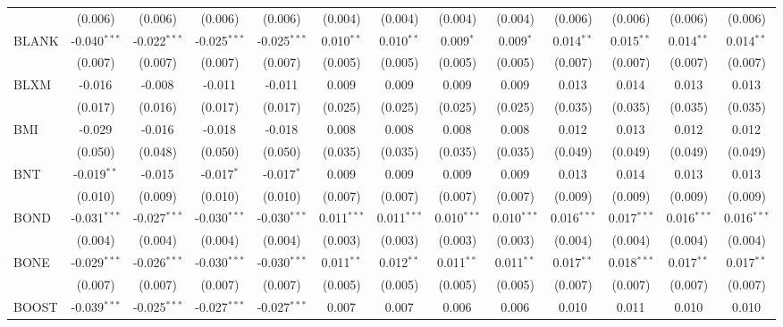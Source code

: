 \begin{table}[!htbp]
\begin{tabular}{@{\extracolsep{5pt}}lcccccccccccc}
  & (0.006) & (0.006) & (0.006) & (0.006) & (0.004) & (0.004) & (0.004) & (0.004) & (0.006) & (0.006) & (0.006) & (0.006) \\
 BLANK & -0.040$^{***}$ & -0.022$^{***}$ & -0.025$^{***}$ & -0.025$^{***}$ & 0.010$^{**}$ & 0.010$^{**}$ & 0.009$^{*}$ & 0.009$^{*}$ & 0.014$^{**}$ & 0.015$^{**}$ & 0.014$^{**}$ & 0.014$^{**}$ \\
  & (0.007) & (0.007) & (0.007) & (0.007) & (0.005) & (0.005) & (0.005) & (0.005) & (0.007) & (0.007) & (0.007) & (0.007) \\
 BLXM & -0.016$^{}$ & -0.008$^{}$ & -0.011$^{}$ & -0.011$^{}$ & 0.009$^{}$ & 0.009$^{}$ & 0.009$^{}$ & 0.009$^{}$ & 0.013$^{}$ & 0.014$^{}$ & 0.013$^{}$ & 0.013$^{}$ \\
  & (0.017) & (0.016) & (0.017) & (0.017) & (0.025) & (0.025) & (0.025) & (0.025) & (0.035) & (0.035) & (0.035) & (0.035) \\
 BMI & -0.029$^{}$ & -0.016$^{}$ & -0.018$^{}$ & -0.018$^{}$ & 0.008$^{}$ & 0.008$^{}$ & 0.008$^{}$ & 0.008$^{}$ & 0.012$^{}$ & 0.013$^{}$ & 0.012$^{}$ & 0.012$^{}$ \\
  & (0.050) & (0.048) & (0.050) & (0.050) & (0.035) & (0.035) & (0.035) & (0.035) & (0.049) & (0.049) & (0.049) & (0.049) \\
 BNT & -0.019$^{**}$ & -0.015$^{}$ & -0.017$^{*}$ & -0.017$^{*}$ & 0.009$^{}$ & 0.009$^{}$ & 0.009$^{}$ & 0.009$^{}$ & 0.013$^{}$ & 0.014$^{}$ & 0.013$^{}$ & 0.013$^{}$ \\
  & (0.010) & (0.009) & (0.010) & (0.010) & (0.007) & (0.007) & (0.007) & (0.007) & (0.009) & (0.009) & (0.009) & (0.009) \\
 BOND & -0.031$^{***}$ & -0.027$^{***}$ & -0.030$^{***}$ & -0.030$^{***}$ & 0.011$^{***}$ & 0.011$^{***}$ & 0.010$^{***}$ & 0.010$^{***}$ & 0.016$^{***}$ & 0.017$^{***}$ & 0.016$^{***}$ & 0.016$^{***}$ \\
  & (0.004) & (0.004) & (0.004) & (0.004) & (0.003) & (0.003) & (0.003) & (0.003) & (0.004) & (0.004) & (0.004) & (0.004) \\
 BONE & -0.029$^{***}$ & -0.026$^{***}$ & -0.030$^{***}$ & -0.030$^{***}$ & 0.011$^{**}$ & 0.012$^{**}$ & 0.011$^{**}$ & 0.011$^{**}$ & 0.017$^{**}$ & 0.018$^{***}$ & 0.017$^{**}$ & 0.017$^{**}$ \\
  & (0.007) & (0.007) & (0.007) & (0.007) & (0.005) & (0.005) & (0.005) & (0.005) & (0.007) & (0.007) & (0.007) & (0.007) \\
 BOOST & -0.039$^{***}$ & -0.025$^{***}$ & -0.027$^{***}$ & -0.027$^{***}$ & 0.007$^{}$ & 0.007$^{}$ & 0.006$^{}$ & 0.006$^{}$ & 0.010$^{}$ & 0.011$^{}$ & 0.010$^{}$ & 0.010$^{}$ \\

\end{tabular}
\end{table}
